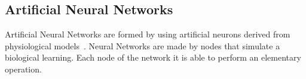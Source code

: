\documentclass{standalone}
\begin{document}
	
	\subsection{Artificial Neural Networks}
	
	Artificial Neural Networks are formed by using artificial neurons derived from physiological models~\cite{INP:Withey}. Neural Networks are made by nodes that simulate a biological learning. Each node of the network it is able to perform an elementary operation. 
	
\end{document}
